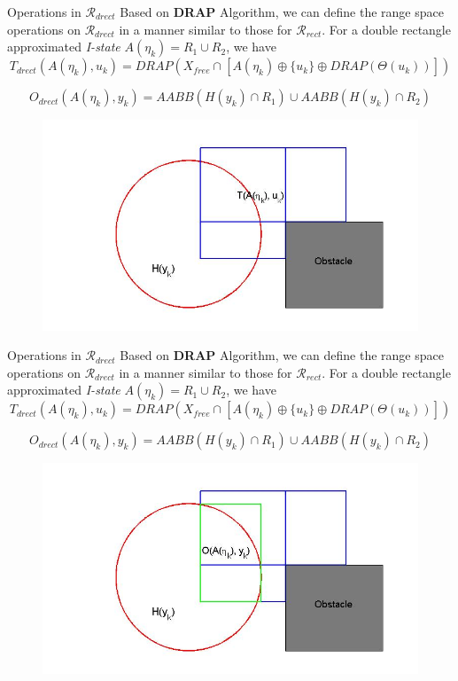\begin{frame}{Operations in $\mathcal{R}_{drect}$}
  Based on \textbf{DRAP} Algorithm, we can define the range space operations on
  $\mathcal{R}_{drect}$ in a manner similar to those for $\mathcal{R}_{rect}$.
  For a double rectangle approximated \emph{I-state} $A(\eta_k) = R_1 \cup R_2$,
  we have
$$ T_{drect}(A(\eta_k), u_k) = DRAP(X_{free} \cap [A(\eta_k) \oplus \{ u_k \} \oplus DRAP(\Theta(u_k))])$$

  $$O_{drect}(A(\eta_k), y_k) = AABB(H(y_k) \cap R_1)\cup AABB(H(y_k) \cap R_2)$$
  \begin{figure}
    \includegraphics[scale=0.3]{figs/drectevolve3.jpg}
  \end{figure}
\end{frame}

\begin{frame}{Operations in $\mathcal{R}_{drect}$}
  Based on \textbf{DRAP} Algorithm, we can define the range space operations on
  $\mathcal{R}_{drect}$ in a manner similar to those for $\mathcal{R}_{rect}$.
  For a double rectangle approximated \emph{I-state} $A(\eta_k) = R_1 \cup R_2$,
  we have
   $$ T_{drect}(A(\eta_k), u_k) = DRAP(X_{free} \cap [A(\eta_k) \oplus \{ u_k \} \oplus DRAP(\Theta(u_k))])$$

  $$O_{drect}(A(\eta_k), y_k) = AABB(H(y_k) \cap R_1)\cup AABB(H(y_k) \cap R_2)$$
  \begin{figure}
    \includegraphics[scale=0.3]{figs/drectevolve4.jpg}
  \end{figure}
\end{frame}

